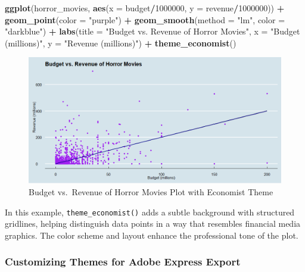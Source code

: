 \documentclass[
]{book}
\newenvironment{Shaded}{\begin{snugshade}}{\end{snugshade}}
\newcommand{\AttributeTok}[1]{\textcolor[rgb]{0.13,0.29,0.53}{#1}}
\newcommand{\DecValTok}[1]{\textcolor[rgb]{0.00,0.00,0.81}{#1}}
\newcommand{\FunctionTok}[1]{\textcolor[rgb]{0.13,0.29,0.53}{\textbf{#1}}}
\newcommand{\NormalTok}[1]{#1}
\newcommand{\SpecialCharTok}[1]{\textcolor[rgb]{0.81,0.36,0.00}{\textbf{#1}}}
\newcommand{\StringTok}[1]{\textcolor[rgb]{0.31,0.60,0.02}{#1}}
\begin{document}
\begin{Shaded}
\begin{Highlighting}[]
\FunctionTok{ggplot}\NormalTok{(horror\_movies, }\FunctionTok{aes}\NormalTok{(}\AttributeTok{x =}\NormalTok{ budget}\SpecialCharTok{/}\DecValTok{1000000}\NormalTok{, }\AttributeTok{y =}\NormalTok{ revenue}\SpecialCharTok{/}\DecValTok{1000000}\NormalTok{)) }\SpecialCharTok{+}
  \FunctionTok{geom\_point}\NormalTok{(}\AttributeTok{color =} \StringTok{"purple"}\NormalTok{) }\SpecialCharTok{+}
  \FunctionTok{geom\_smooth}\NormalTok{(}\AttributeTok{method =} \StringTok{"lm"}\NormalTok{, }\AttributeTok{color =} \StringTok{"darkblue"}\NormalTok{) }\SpecialCharTok{+}
  \FunctionTok{labs}\NormalTok{(}\AttributeTok{title =} \StringTok{"Budget vs. Revenue of Horror Movies"}\NormalTok{, }\AttributeTok{x =} \StringTok{"Budget (millions)"}\NormalTok{, }\AttributeTok{y =} \StringTok{"Revenue (millions)"}\NormalTok{) }\SpecialCharTok{+}
  \FunctionTok{theme\_economist}\NormalTok{()}
\end{Highlighting}
\end{Shaded}

\begin{figure}
\centering
\includegraphics[width=1\textwidth,height=\textheight]{images/horror_economist.png}
\caption{Budget vs.~Revenue of Horror Movies Plot with Economist Theme}
\end{figure}

In this example, \texttt{theme\_economist()} adds a subtle background with structured gridlines, helping distinguish data points in a way that resembles financial media graphics. The color scheme and layout enhance the professional tone of the plot.

\subsubsection*{Customizing Themes for Adobe Express Export}\label{customizing-themes-for-adobe-express-export}
\end{document}
